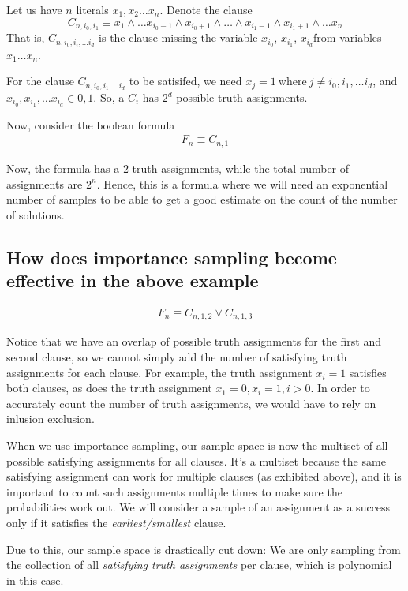 \documentclass{article}
\begin{document}
Let us have $n$ literals $x_1, x_2 \dots x_n$. Denote the clause
$$C_{n, i_0, i_1} \equiv x_1 \land \dots x_{i_0 - 1} \land x_{i_0 + 1} \land \dots \land x_{i_1-1} \land x_{i_1+1} \land \dots x_n$$
That is, $C_{n, i_0, i_i, \dots i_d}$ is the clause missing the variable $x_{i_0}$,
$x_{i_1}$, $x_{i_d}$from variables $x_1 \dots x_n$.


For the clause $C_{n, i_0, i_1, \dots i_d}$ to be satisifed, we need $x_j = 1~\text{where}~j \neq i_0, i_1, \dots i_d$,
and $x_{i_0}, x_{i_1}, \dots x_{i_d} \in {0, 1}$. So, a $C_i$ has $2^d$ possible
truth assignments.

Now, consider the boolean formula
\begin{align*}
    F_n \equiv C_{n, 1}
\end{align*}

Now, the formula has a $2$ truth assignments, while the total number of assignments
are $2^n$. Hence, this is a formula where we will need an exponential number of
samples to be able to get a good estimate on the count of the number of
solutions.


\subsection{How does importance sampling become effective in the above example}


\begin{align*}
    F_n \equiv C_{n, 1, 2} \lor C_{n, 1, 3}
\end{align*}

Notice that we have an overlap of possible truth assignments for the first
and second clause, so we cannot simply add the number of satisfying truth
assignments for each clause. For example, the truth assignment $x_i = 1$ satisfies
both clauses, as does the truth assignment $x_1 = 0, x_i = 1, i > 0$. In order
to accurately count the number of truth assignments, we would have to rely on
inlusion exclusion.

When we use importance sampling, our sample space is now the multiset of all
possible satisfying assignments for all clauses. It's a multiset because the
same satisfying assignment can work for multiple clauses (as exhibited above),
and it is important to count such assignments multiple times to make sure
the probabilities work out. We will consider a sample of an assignment as a
success only if it satisfies the \textit{earliest/smallest} clause.

Due to this, our sample space is drastically cut down: We are only sampling
from the collection of all \textit{satisfying truth assignments} per clause,
which is polynomial in this case.
\end{document}

